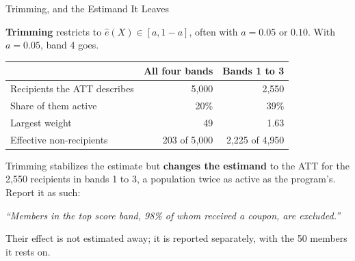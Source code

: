 \documentclass[aspectratio=169, 11pt, handout]{beamer}
\begin{document}
\begin{frame}{Trimming, and the Estimand It Leaves}

\textbf{Trimming} restricts to $\hat e(X) \in [a, 1-a]$, often with $a = 0.05$ or $0.10$. With $a = 0.05$, band 4 goes.

\begin{center}
\small
\begin{tabular}{lrr}
\toprule
& \textbf{All four bands} & \textbf{Bands 1 to 3} \\
\midrule
Recipients the ATT describes & 5{,}000 & 2{,}550 \\
Share of them active & 20\% & 39\% \\
Largest weight & 49 & 1.63 \\
Effective non-recipients & 203 of 5{,}000 & 2{,}225 of 4{,}950 \\
\bottomrule
\end{tabular}
\end{center}

\medskip

Trimming stabilizes the estimate but \textbf{changes the estimand} to the ATT for the 2{,}550 recipients in bands 1 to 3, a population twice as active as the program's. Report it as such:

\begin{center}
\emph{``Members in the top score band, 98\% of whom received a coupon, are excluded.''}
\end{center}

Their effect is not estimated away; it is reported separately, with the 50 members it rests on.
\end{frame}
\end{document}
